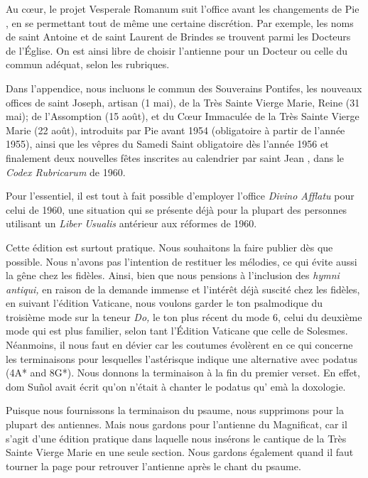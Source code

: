\begin{frpars}

Au cœur, le projet Vesperale Romanum suit l'office avant les changements de Pie , en se permettant tout de même une certaine discrétion. Par exemple, les noms de saint Antoine et de saint Laurent de Brindes se trouvent parmi les Docteurs de l'Église. On est ainsi libre de choisir l'antienne pour un Docteur ou celle du commun adéquat, selon les rubriques.

Dans l'appendice, nous incluons le commun des Souverains Pontifes, les nouveaux offices de saint Joseph, artisan (1 mai), de la Très Sainte Vierge Marie, Reine (31 mai); de l'Assomption (15 août), et du Cœur Immaculée de la Très Sainte Vierge Marie (22 août), introduits par Pie  avant 1954 (obligatoire à partir de l'année 1955), ainsi que les vêpres du Samedi Saint obligatoire dès l'année 1956 et finalement deux nouvelles fêtes inscrites au calendrier par saint Jean , dans le \textit{Codex Rubricarum} de 1960.

Pour l'essentiel, il est tout à fait possible d'employer l'office \textit{Divino Afflatu} pour celui de 1960, une situation qui se présente déjà pour la plupart des personnes utilisant un \textit{Liber Usualis} antérieur aux réformes de 1960.

Cette édition est surtout pratique. Nous souhaitons la faire publier dès que possible. Nous n'avons pas l'intention de restituer les mélodies, ce qui évite aussi la gêne chez les fidèles. Ainsi, bien que nous pensions à l'inclusion des \textit{hymni antiqui,} en raison de la demande immense et l'intérêt déjà suscité chez les fidèles, en suivant l'édition Vaticane, nous voulons garder le ton psalmodique du troisième mode sur la teneur \textit{Do,} le ton plus récent du mode 6, celui du deuxième mode qui est plus familier, selon tant l'Édition Vaticane que celle de Solesmes. Néanmoins, il nous faut en dévier car les coutumes évolèrent en ce qui concerne les terminaisons pour lesquelles l'astérisque indique une alternative avec podatus (4A* and 8G*). Nous donnons la terminaison à la fin du premier verset. En effet, dom Suñol avait écrit qu'on n'était à chanter le podatus qu' emà la doxologie.

Puisque nous fournissons la terminaison du psaume, nous supprimons  pour la plupart des antiennes. Mais nous gardons  pour l'antienne du Magnificat, car il s'agit d'une édition pratique dans laquelle nous insérons le cantique de la Très Sainte Vierge Marie en une seule section. Nous gardons également  quand il faut tourner la page pour retrouver l'antienne après le chant du psaume.


\end{frpars}
